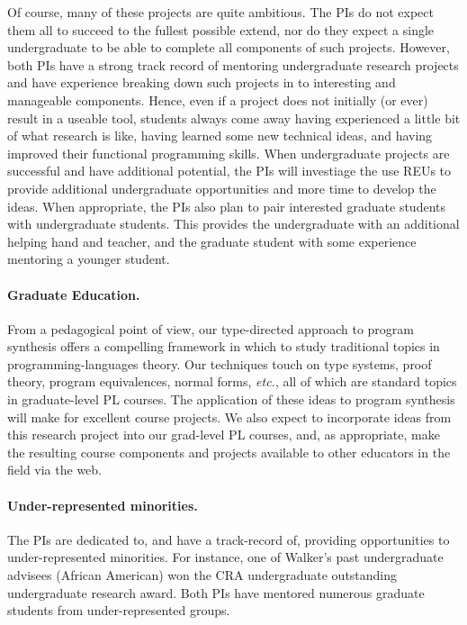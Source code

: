 Of course, many of these projects are quite ambitious.  The PIs do not
expect them all to succeed to the fullest possible extend, nor do they
expect a single undergraduate to be able to complete all components of
such projects.  However, both PIs have a strong track record of mentoring
undergraduate research projects and have experience breaking down 
such projects in to interesting and manageable components.  
Hence, even if a project does not initially (or ever) result in a
useable tool, students always come away having experienced a little 
bit of what research is like, having learned some new technical ideas, and 
having improved their functional programming skills. When undergraduate 
projects are successful and have additional potential, the PIs will
investiage the use REUs to provide additional undergraduate opportunities
and more time to develop the ideas.
When appropriate, 
the PIs also plan to pair interested graduate students with undergraduate 
students.  This provides the undergraduate with
an additional helping hand and teacher, and the graduate student with
some experience mentoring a younger student.  


\paragraph*{Graduate Education.}
From a pedagogical point of view, our type-directed approach
to program synthesis offers a compelling framework in which to study
traditional topics in programming-languages theory.  Our techniques
touch on type systems, proof theory, program equivalences, normal
forms, \textit{etc.}, all of which are standard topics in graduate-level
PL courses.  The application of these ideas to program synthesis will make
for excellent course projects.  We also expect to incorporate ideas from
this research project into our grad-level PL courses, and, as
appropriate, make the resulting course components and projects
available to other educators in the field via the web.

\paragraph*{Under-represented minorities.} The PIs are dedicated
to, and have a track-record of, providing opportunities to under-represented 
minorities.  For instance, one of Walker's past undergraduate advisees
(African American) won the CRA undergraduate outstanding undergraduate
research award.  Both PIs have mentored numerous graduate students from 
under-represented groups.

